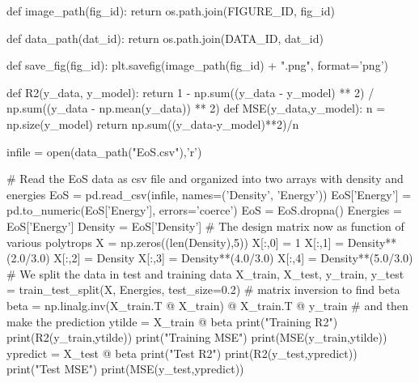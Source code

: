 \documentclass[%
oneside,                 %
final,                   %
10pt]{article}
\newenvironment{doconceexercise}{}{}
\begin{document}
\begin{doconceexercise}
def image_path(fig_id):
    return os.path.join(FIGURE_ID, fig_id)

def data_path(dat_id):
    return os.path.join(DATA_ID, dat_id)

def save_fig(fig_id):
    plt.savefig(image_path(fig_id) + ".png", format='png')

def R2(y_data, y_model):
    return 1 - np.sum((y_data - y_model) ** 2) / np.sum((y_data - np.mean(y_data)) ** 2)
def MSE(y_data,y_model):
    n = np.size(y_model)
    return np.sum((y_data-y_model)**2)/n

infile = open(data_path("EoS.csv"),'r')

# Read the EoS data as  csv file and organized into two arrays with density and energies
EoS = pd.read_csv(infile, names=('Density', 'Energy'))
EoS['Energy'] = pd.to_numeric(EoS['Energy'], errors='coerce')
EoS = EoS.dropna()
Energies = EoS['Energy']
Density = EoS['Density']
#  The design matrix now as function of various polytrops
X = np.zeros((len(Density),5))
X[:,0] = 1
X[:,1] = Density**(2.0/3.0)
X[:,2] = Density
X[:,3] = Density**(4.0/3.0)
X[:,4] = Density**(5.0/3.0)
# We split the data in test and training data
X_train, X_test, y_train, y_test = train_test_split(X, Energies, test_size=0.2)
# matrix inversion to find beta
beta = np.linalg.inv(X_train.T @ X_train) @ X_train.T @ y_train
# and then make the prediction
ytilde = X_train @ beta
print("Training R2")
print(R2(y_train,ytilde))
print("Training MSE")
print(MSE(y_train,ytilde))
ypredict = X_test @ beta
print("Test R2")
print(R2(y_test,ypredict))
print("Test MSE")
print(MSE(y_test,ypredict))
\epycod


\end{doconceexercise}
\end{document}
